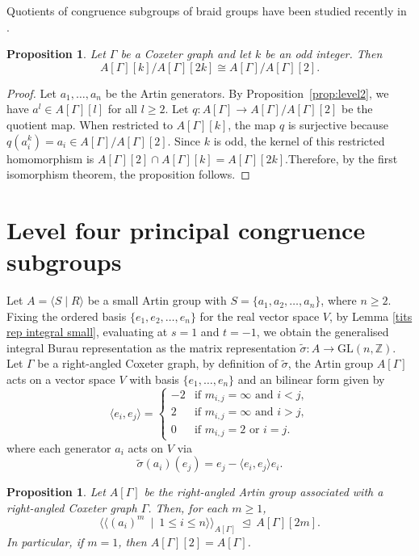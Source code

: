 \documentclass[12pt]{amsart}
\newtheorem{proposition}[equation]{Proposition}
\theoremstyle{definition}
\numberwithin{equation}{section}
\newcommand{\GL}{\mathrm{GL}}
\begin{document}
Quotients of congruence subgroups of braid groups have been studied recently in \cite{quotientbraid, MR4811535}.

\begin{proposition}
Let $\Gamma$ be a Coxeter graph and let $k$ be an odd integer. Then 
$$A[\Gamma][k]/A[\Gamma][2k]\cong A[\Gamma]/A[\Gamma][2].$$
\end{proposition}
\begin{proof}
Let $a_1, \ldots, a_n$ be the Artin generators.  By Proposition~\ref{prop:level2}, we have $a^l \in A[\Gamma][l]$ for all $l \geq 2$. Let $q:A[\Gamma]\to A[\Gamma]/A[\Gamma][2]$ be the quotient map.  When restricted to $A[\Gamma][k]$, the map $q$ is surjective because $q(a_i^k)=a_i \in A[\Gamma]/A[\Gamma][2]$.
 Since $k$ is odd, the kernel of this restricted homomorphism is $A[\Gamma][2]\cap A[\Gamma][k]=A[\Gamma][2k]$.Therefore, by the first isomorphism theorem, the proposition follows.
\end{proof}
\medskip


\section{Level four principal congruence subgroups}\label{section 7}
Let $A= \langle S \mid R \rangle$ be a small Artin group with $S=\{a_1,a_2,\ldots,a_{n}\}$, where $n \ge 2$. Fixing the ordered basis $\{e_1,e_2,\ldots,e_{n}\}$ for the real vector space $V$, by Lemma \ref{tits rep integral small}, evaluating at $s=1$ and $t=-1$, we obtain the generalised integral Burau representation as the matrix representation $\tilde{\sigma}:A \to \GL(n,\mathbb Z)$. Let $\Gamma$ be a right-angled Coxeter graph, by definition of $\tilde{\sigma}$, the Artin group $A[\Gamma]$ acts on a vector space $V$ with basis $\{e_1, \ldots, e_n\}$ and an bilinear form given by
$$
\langle e_i, e_j \rangle = \begin{cases}
-2 & \text {if } m_{i,j}=\infty \text{ and } i<j, \\
2 & \text {if } m_{i,j}=\infty \text{ and } i>j,\\
0 & \text {if } m_{i,j}=2 \text{ or } i=j.
\end{cases}
$$
where each generator $a_i$ acts on $V$ via
$$
\tilde{\sigma}(a_i)(e_j) = e_j - \langle e_i, e_j \rangle e_i.
$$

\begin{proposition}\label{prop:level4raag}
Let $A[\Gamma]$ be the right-angled Artin group associated with a right-angled Coxeter graph $\Gamma$. Then, for each $m \ge 1$, 
$$\langle \langle \left(a_i\right)^m ~\mid~ 1 \le i \le n\rangle \rangle_{A[\Gamma]}~ \unlhd ~A[\Gamma][2m].$$ 
In particular, if $m=1$, then $A[\Gamma][2]=A[\Gamma]$.
\end{proposition}
\end{document}
